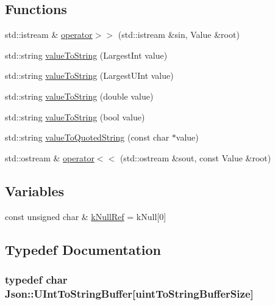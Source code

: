 \subsection*{Functions}
\begin{DoxyCompactItemize}
\item 
std\+::istream \& \hyperlink{namespaceJson_a2434499c0c7f057890b32787c05fc4a3}{operator$>$$>$} (std\+::istream \&sin, Value \&root)
\item 
std\+::string \hyperlink{namespaceJson_abd9c650f70d9434f98f9025e2e2faf2d}{value\+To\+String} (Largest\+Int value)
\item 
std\+::string \hyperlink{namespaceJson_a3f46b0bc62b95a9426a2da0117bdf9f0}{value\+To\+String} (Largest\+U\+Int value)
\item 
std\+::string \hyperlink{namespaceJson_a99995d7dafa4f4970b349d7d3c8d1d99}{value\+To\+String} (double value)
\item 
std\+::string \hyperlink{namespaceJson_a979ed531f091985e22f0051cd2a8e341}{value\+To\+String} (bool value)
\item 
std\+::string \hyperlink{namespaceJson_aa0c8235a4a5c6599da5d3332743db8ac}{value\+To\+Quoted\+String} (const char $\ast$value)
\item 
std\+::ostream \& \hyperlink{namespaceJson_a170ed6561399621db20f291e33b64fb7}{operator$<$$<$} (std\+::ostream \&sout, const Value \&root)
\end{DoxyCompactItemize}
\subsection*{Variables}
\begin{DoxyCompactItemize}
\item 
const unsigned char \& \hyperlink{namespaceJson_ab30055b4bbd82aecaca57ccecd63bbe6}{k\+Null\+Ref} = k\+Null\mbox{[}0\mbox{]}
\end{DoxyCompactItemize}


\subsection{Typedef Documentation}
\hypertarget{namespaceJson_a602bcf69c2042fb61c3b243cb16f04ca}{}
\subsubsection[{U\+Int\+To\+String\+Buffer}]{\setlength{\rightskip}{0pt plus 5cm}typedef char Json\+::\+U\+Int\+To\+String\+Buffer\mbox{[}{\bf uint\+To\+String\+Buffer\+Size}\mbox{]}}\label{namespaceJson_a602bcf69c2042fb61c3b243cb16f04ca}


